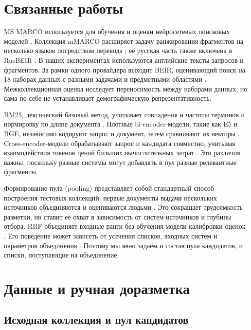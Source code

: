 \documentclass[runningheads,a4paper]{llncs}
\begin{document}
\section{Связанные работы}
\label{sec:related}

MS MARCO используется для обучения и оценки нейросетевых поисковых моделей \cite{bajaj2016msmarco}. Коллекция mMARCO расширяет задачу ранжирования фрагментов на несколько языков посредством перевода \cite{bonifacio2022mmarco}; её русская часть также включена в RusBEIR \cite{2025rusbeir}. В наших экспериментах используются английские тексты запросов и фрагментов. За рамки одного провайдера выходит BEIR, оценивающий поиск на 18 наборах данных с разными задачами и предметными областями \cite{thakur2021beir}. Межколлекционная оценка исследует переносимость между наборами данных, но сама по себе не устанавливает демографическую репрезентативность.

BM25, лексический базовый метод, учитывает совпадения и частоты терминов и нормировку по длине документа \cite{robertson2009bm25}. Плотные bi-encoder-модели, такие как E5 и BGE, независимо кодируют запрос и документ, затем сравнивают их векторы \cite{wang2022e5,xiao2023cpack}. Cross-encoder-модели обрабатывают запрос и кандидата совместно, учитывая взаимодействия токенов ценой больших вычислительных затрат \cite{nogueira2019bert}. Эти различия важны, поскольку разные системы могут добавлять в пул разные релевантные фрагменты.

Формирование пула (pooling) представляет собой стандартный способ построения тестовых коллекций: первые документы выдачи нескольких источников объединяются и оцениваются людьми \cite{voorhees2005trec}. Это сокращает трудоёмкость разметки, но ставит её охват в зависимость от систем-источников и глубины отбора. RRF объединяет входные ранги без обучения модели калибровки оценок \cite{cormack2009rrf}. Его поведение может зависеть от усечения списков, входных систем и параметров объединения \cite{bruch2023fusion}. Поэтому мы явно задаём и состав пула кандидатов, и списки, поступающие на объединение.

\section{Данные и ручная доразметка}
\label{sec:data}

\subsection{Исходная коллекция и пул кандидатов}
\end{document}
